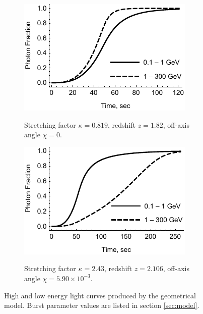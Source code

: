 \documentclass[11pt,a4paper]{article}
\begin{document}
\begin{figure}
	\centering
	\hspace*{\fill}
	\begin{subfigure}{0.45\textwidth}
		\includegraphics[width=\textwidth]{sampleLightCurveLogNegative}
		\label{fig:sampleLightCurveLogNegative}
		\caption{Stretching factor $\kappa = 0.819$, redshift $z = 1.82$, off-axis angle $\chi = 0$.}
	\end{subfigure}
	\hfill
	\begin{subfigure}{0.45\textwidth}
		\includegraphics[width=\textwidth]{sampleLightCurveLogPositive}
		\label{fig:sampleLightCurveLogPosivie}
		\caption{Stretching factor $\kappa = 2.43$, redshift $z = 2.106$, off-axis angle $\chi = 5.90 \times 10^{-3}$.}
	\end{subfigure}
	\hspace*{\fill}
	\caption{
		High and low energy light curves produced by the geometrical model.
		Burst parameter values are listed in section \ref{sec:model}.
	}
	\label{fig:sampleLightCurves}
\end{figure}
\end{document}
